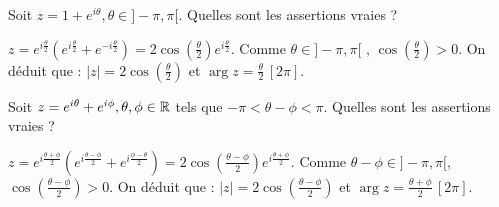 \begin{question} 

Soit $z=1+ e^{i\theta},\theta \in ]-\pi,\pi[$. Quelles sont les assertions vraies ?
\begin{answers}
    
    


\end{answers}
\begin{explanations}
$z=e^{i\frac{\theta}{2}} (e^{i\frac{\theta}{2}} + e^{-i\frac{\theta}{2}}) = 2 \cos (\frac{\theta}{2}) e^{i\frac{\theta}{2}}$. Comme $\theta \in ]-\pi,\pi[$ ,  $\cos (\frac{\theta}{2})>0$. On déduit que : $|z|=2\cos (\frac{\theta}{2})$ et $\arg z =  \frac{\theta}{2} \, [2\pi]$.
\end{explanations}

\end{question}






\begin{question} 

Soit $z=e^{i\theta} + e^{i\phi} ,\theta, \phi \in \mathbb{R}$ tels que $-\pi < \theta - \phi < \pi$. Quelles sont les assertions vraies ?
\begin{answers}
    
    


\end{answers}
\begin{explanations}
$ z=e^{i\frac{\theta+\phi}{2}} (e^{i\frac{\theta-\phi}{2}} + e^{i\frac{\phi - \theta}{2}}) = 2 \cos (\frac{\theta-\phi}{2}) e^{i\frac{\theta+\phi}{2}}$. Comme $\theta-\phi \in ]-\pi,\pi[$,   $\cos (\frac{\theta-\phi}{2})>0$. On déduit que : $|z|=2\cos (\frac{\theta-\phi}{2})$ et $\arg z =  \frac{\theta+\phi}{2} \, [2\pi]$.
\end{explanations}

\end{question}






